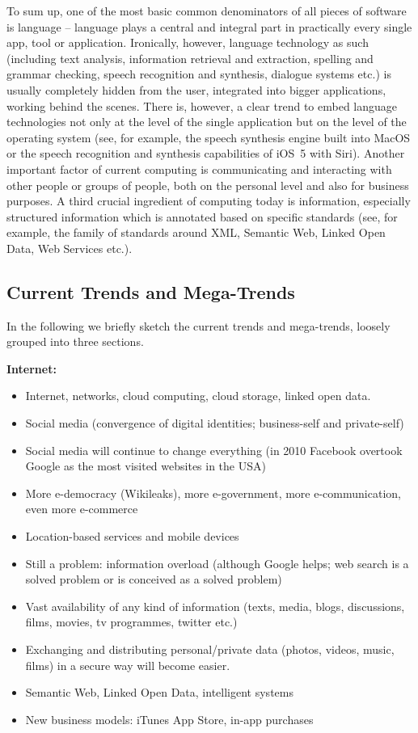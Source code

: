 \documentclass[10pt, plain]{../../metanetpaper}
\begin{document}
\begin{multicols}{2}
To sum up, one of the most basic common denominators of all pieces of software is language -- language plays a central and integral part in practically every single app, tool or application. Ironically, however, language technology as such (including text analysis, information retrieval and extraction, spelling and grammar checking, speech recognition and synthesis, dialogue systems etc.) is usually completely hidden from the user, integrated into bigger applications, working behind the scenes. There is, however, a clear trend to embed language technologies not only at the level of the single application but on the level of the operating system (see, for example, the speech synthesis engine built into MacOS or the speech recognition and synthesis capabilities of iOS~5 with Siri). Another important factor of current computing is communicating and interacting with other people or groups of people, both on the personal level and also for business purposes.  A third crucial ingredient of computing today is information, especially structured information which is annotated based on specific standards (see, for example, the family of standards around XML, Semantic Web, Linked Open Data, Web Services etc.).

\subsection{Current Trends and Mega-Trends}
\label{sec:major-trends}

In the following we briefly sketch the current trends and mega-trends, loosely grouped into three sections.

\textbf{Internet:} 

\begin{itemize}
\item Internet, networks, cloud computing, cloud storage, linked open data.
\item Social media (convergence of digital identities; business-self and private-self)
\item Social media will continue to change everything (in 2010 Facebook overtook Google as the most visited websites in the USA)
\item More e-democracy (Wikileaks), more e-government, more e-communication, even more e-commerce
\item Location-based services and mobile devices
\item Still a problem: information overload (although Google helps; web search is a solved problem or is conceived as a solved problem)
\item Vast availability of any kind of information (texts, media, blogs, discussions, films, movies, tv programmes, twitter etc.)
\item Exchanging and distributing personal/private data (photos, videos, music, films) in a secure way will become easier.
\item Semantic Web, Linked Open Data, intelligent systems
\item New business models: iTunes App Store, in-app purchases
\end{itemize}


\end{multicols}
\end{document}
